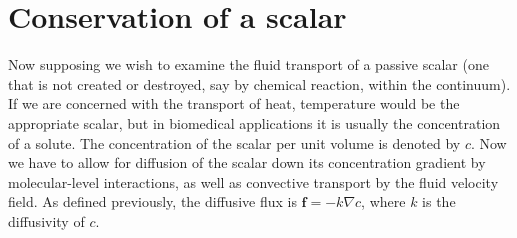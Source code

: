 \documentclass[a4paper,11pt]		{report}
\begin{document}
\section{Conservation of a scalar}

Now supposing we wish to examine the fluid transport of a passive
scalar (\ie one that is not created or destroyed, say by chemical
reaction, within the continuum). If we are concerned with the
transport of heat, temperature would be the appropriate scalar, but in
biomedical applications it is usually the concentration of a
solute. The concentration of the scalar per unit volume is denoted by
$c$. Now we have to allow for diffusion of the scalar down its
concentration gradient by molecular-level interactions, as well as
convective transport by the fluid velocity field. As defined
previously, the diffusive flux is $\bm{f}=-k\nabla c$, where $k$ is
the diffusivity of $c$.
\end{document}
